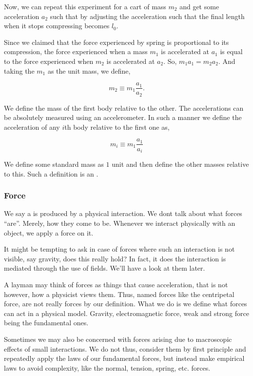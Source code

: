 Now, we can repeat this experiment for a cart of mass \(m_2\) and get some acceleration \(a_2\)
such that by adjusting the acceleration such that the final length when it stops compressing becomes \(l_0\).

Since we claimed that the force experienced by spring is proportional to its
compression, the force experienced when a mass \(m_1\) is accelerated at \(a_1\) is 
equal to the force experienced when \(m_2\) is accelerated at \(a_2\). So, \(m_1a_1 = m_2a_2\). And
taking the \(m_1\) as the unit mass, we define,

\[m_2 \equiv m_1\frac{a_1}{a_2}.\]

We define the mass of the first body relative to the other. The accelerations
can be absolutely measured using an accelerometer. In such a manner we define 
the acceleration of any \(i\)th body relative to the first one as, 

\[m_i \equiv m_1\frac{a_1}{a_i}\]

We define some standard mass as \(1\) unit and then define the other masses 
relative to this. Such a definition is an .

\subsubsection{Force}

We say a  is produced by a physical interaction. We dont 
talk about what forces ``are''. Merely, how they come to be. Whenever 
we interact physically with an object, we apply a force on it.  

It might be tempting to ask in case of forces where such an interaction 
is not visible, say gravity, does this really hold? In fact, it does
the interaction is mediated through the use of fields. We'll have 
a look at them later.

A layman may think of forces as things that cause acceleration, that is not 
however, how a physicist views them. Thus, named forces like the 
centripetal force, are not really forces by our definition. What we do is 
we define what forces can act in a physical model. Gravity, electromagnetic force,
weak and strong force being the fundamental ones. 

Sometimes we may also be concerned with forces arising due to macroscopic effects
of small interactions. We do not thus, consider them by first principle and repeatedly 
apply the laws of our fundamental forces, but instead make empirical laws 
to avoid complexity, like the normal, tension, spring, etc. forces. 

